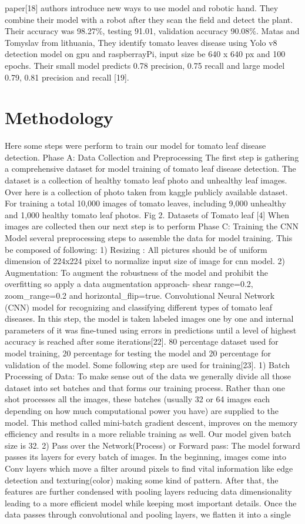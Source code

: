 \documentclass[conference]{IEEEtran}
\begin{document}
paper[18] authors introduce new ways to use model and robotic hand. They combine their model with a robot after they scan the field and detect the plant. Their accuracy was 98.27\%, testing 91.01, validation accuracy 90.08\%. Matas and Tomyslav from lithuania, They identify tomato leaves disease using Yolo v8 detection model on gpu and raspberrayPi, input size be 640 x 640 px and 100 epochs. Their small model predicts 0.78 precision, 0.75 recall and large model 0.79, 0.81 precision and recall [19].

\section{Methodology}
Here some steps were perform to train our model for tomato leaf disease detection. Phase A: Data Collection and Preprocessing The first step is gathering a comprehensive dataset for model training of tomato leaf disease detection. The dataset is a collection of healthy tomato leaf photo and unhealthy leaf images. Over here is a collection of photo taken from kaggle publicly available dataset. For training a total 10,000 images of tomato leaves, including 9,000 unhealthy and 1,000 healthy tomato leaf photos. Fig 2. Datasets of Tomato leaf [4] When images are collected then our next step is to perform Phase C: Training the CNN Model several preprocessing steps to assemble the data for model training. This be composed of following: 1) Resizing : All pictures should be of uniform dimension of 224x224 pixel to normalize input size of image for cnn model. 2) Augmentation: To augment the robustness of the model and prohibit the overfitting so apply a data augmentation approach- shear range=0.2, zoom\_range=0.2 and horizontal\_flip=true. Convolutional Neural Network (CNN) model for recognizing and classifying different types of tomato leaf diseases. In this step, the model is taken labeled images one by one and internal parameters of it was fine-tuned using errors in predictions until a level of highest accuracy is reached after some iterations[22]. 80 percentage dataset used for model training, 20 percentage for testing the model and 20 percentage for validation of the model. Some following step are used for training[23]. 1) Batch Processing of Data: To make sense out of the data we generally divide all those dataset into set batches and that forms our training process. Rather than one shot processes all the images, these batches (usually 32 or 64 images each depending on how much computational power you have) are supplied to the model. This method called mini-batch gradient descent, improves on the memory efficiency and results in a more reliable training as well. Our model given batch size is 32. 2) Pass over the Network(Process) or Forward pass: The model forward passes its layers for every batch of images. In the beginning, images come into Conv layers which move a filter around pixels to find vital information like edge detection and texturing(color) making some kind of pattern. After that, the features are further condensed with pooling layers reducing data dimensionality leading to a more efficient model while keeping most important details. Once the data passes through convolutional and pooling layers, we flatten it into a single 
\end{document}
